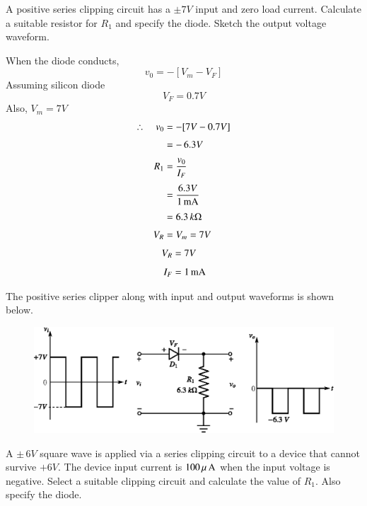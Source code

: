\smallskip
\begin{example}\label{exam2.38}
A positive series clipping circuit has a $\pm 7V$ input and zero load current. Calculate a suitable resistor for $R_{1}$ and specify the diode. Sketch the output voltage waveform.
\end{example}

\begin{solution}
When the diode conducts,
$$
v_{0}=-[V_{m}-V_{F}]
$$
Assuming silicon diode
$$
V_{F}=0.7V
$$
Also, $V_{m}=7V$
\begin{align*}
\therefore\quad v_{0} &= -[7V-0.7V]\\[3pt]
&=-\,6.3V\\[3pt]
R_{1} &= \frac{v_{0}}{I_{F}}\\[3pt]
&= \frac{6.3V}{1\operatorname{mA}}\\[3pt]
&=6.3\,k\Omega\\[3pt]
V_{R} &= V_{m}=7V
\end{align*}
\begin{align*}
V_{R} &= 7V\\[4pt]
I_{F} &= 1\operatorname{mA}
\end{align*}

\eject

The positive series clipper along with input and output waveforms is shown below.
\begin{figure}[H]
\centering
\includegraphics{chap2/sol2.38.eps}
\end{figure}
\vskip -1cm
\end{solution}

\smallskip

\begin{example}\label{exam2.39}
A $\pm\, 6V$ square wave is applied via a series clipping circuit to a device that cannot survive $+6V$. The device input current is $100\,\mu \text{\,A}$ when the input voltage is negative. Select a suitable clipping circuit and calculate the value of $R_{1}$. Also specify the diode.
\end{example}

